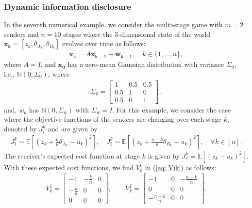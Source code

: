 \documentclass[12pt,journal,onecolumn]{IEEEtran}
\begin{document}
\subsubsection{Dynamic information disclosure} In the seventh numerical example, we consider the multi-stage game with $m=2$ senders and $n = 10$ stages where the $3$-dimensional state of the world $\boldsymbol{x_k} = [z_k, \theta_{A_k},\theta_{B_k} ]$ evolves over time as follows:
\begin{align}
    \boldsymbol{x_k} = A\boldsymbol{x_{k-1}}+ \boldsymbol{w_{k-1}}, \quad k\in\{1,\dots,n\},
\end{align}
where $A = I$, and $\boldsymbol{x_0}$ has a zero-mean Gaussian distribution with variance $\Sigma_0$, i.e., $\mathbb{N}(0,\Sigma_0)$, where 
\begin{align*}
    \Sigma_0 =\begin{bmatrix}
    1 & 0.5 &0.5\\
    0.5&1 &0\\
    0.5 &0 &1
    \end{bmatrix},
\end{align*}
and, $w_{k}$ has $\mathbb{N}(0,\Sigma_w)$ with $\Sigma_w = I$. For this example, we consider the case where the objective functions of the senders are changing over each stage $k$, denoted by $J_{i}^k$ and are given by 
\begin{align}\label{eqn:ex_7}
    J_{1}^k =\mathbb{E}\left[ \left({z_k}+\frac{k}{n}{\theta_{A_k}}-u_k\right)^2\right], \quad J_{2}^k =\mathbb{E}\left[ \left({z_k}+\frac{n-k}{n}{\theta_{B_k}}-u_k\right)^2\right], \quad \forall k \in [n].
\end{align}
The receiver's expected cost function at stage $k$ is given by $J_{r}^k =\mathbb{E}[ (z_k-u_k)^2]$. With these expected cost functions, we find $V_k^i$ in (\ref{eq: Vik}) as follows:
\begin{align*}
    V_k^1=\begin{bmatrix}-1 & -\frac{k}{n}&0\\-\frac{k}{n}&0 &0\\0 &0 &0\end{bmatrix},\qquad V_k^2=\begin{bmatrix}-1 &0 &-\frac{n-k}{n}\\0 &0 &0\\-\frac{n-k}{n} &0 &0\end{bmatrix}.
\end{align*}
\end{document}
